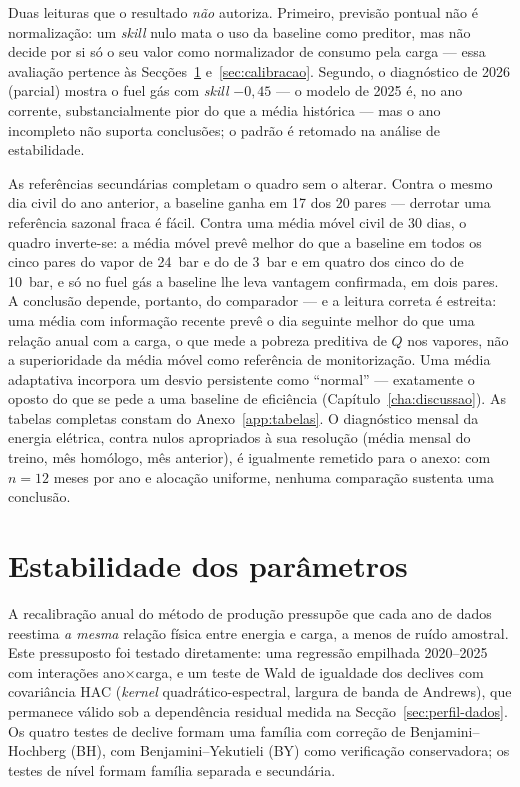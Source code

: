 Duas leituras que o resultado \emph{não} autoriza. Primeiro, previsão pontual
não é normalização: um \emph{skill} nulo mata o uso da baseline como preditor,
mas não decide por si só o seu valor como normalizador de consumo pela carga
--- essa avaliação pertence às Secções~\ref{sec:estabilidade}
e~\ref{sec:calibracao}. Segundo, o diagnóstico de 2026 (parcial) mostra o
fuel gás com \emph{skill} $-0{,}45$ --- o modelo de 2025 é, no ano corrente,
substancialmente pior do que a média histórica --- mas o ano incompleto não
suporta conclusões; o padrão é retomado na análise de estabilidade.

As referências secundárias completam o quadro sem o alterar. Contra o mesmo
dia civil do ano anterior, a baseline ganha em 17 dos 20 pares --- derrotar
uma referência sazonal fraca é fácil. Contra uma média móvel civil de 30
dias, o quadro inverte-se: a média móvel prevê melhor do que a baseline em
todos os cinco pares do vapor de 24~bar e do de 3~bar e em quatro dos cinco
do de 10~bar, e só no fuel gás a baseline lhe leva vantagem confirmada, em
dois pares. A conclusão depende, portanto, do comparador --- e a leitura
correta é estreita: uma média com informação recente prevê o dia seguinte
melhor do que uma relação anual com a carga, o que mede a pobreza preditiva
de $Q$ nos vapores, não a superioridade da média móvel como referência de
monitorização. Uma média adaptativa incorpora um desvio persistente como
``normal'' --- exatamente o oposto do que se pede a uma baseline de eficiência
(Capítulo~\ref{cha:discussao}). As tabelas completas constam do
Anexo~\ref{app:tabelas}. O diagnóstico mensal da energia elétrica, contra
nulos apropriados à sua resolução (média mensal do treino, mês homólogo, mês
anterior), é igualmente remetido para o anexo: com $n{=}12$ meses por ano e
alocação uniforme, nenhuma comparação sustenta uma conclusão.

\section{Estabilidade dos parâmetros}
\label{sec:estabilidade}


A recalibração anual do método de produção pressupõe que cada ano de dados
reestima \emph{a mesma} relação física entre energia e carga, a menos de ruído
amostral. Este pressuposto foi testado diretamente: uma regressão
empilhada 2020--2025 com interações ano$\times$carga, e um teste de Wald de
igualdade dos declives com covariância HAC (\emph{kernel} quadrático-espectral,
largura de banda de Andrews), que permanece válido sob a dependência residual
medida na Secção~\ref{sec:perfil-dados}. Os quatro testes de declive formam uma
família com correção de Benjamini--Hochberg (BH), com
Benjamini--Yekutieli (BY) como verificação conservadora; os testes de nível
formam família separada e secundária.


